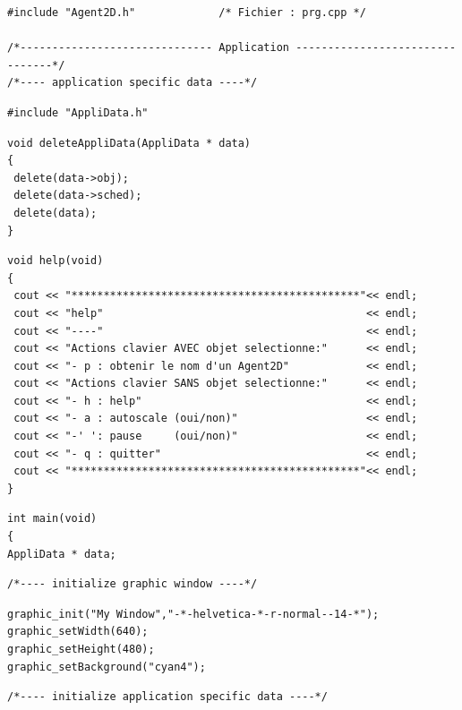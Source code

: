 \documentclass[12pt]{article}
\begin{document}
\begin{small}
\begin{verbatim}
#include "Agent2D.h"             /* Fichier : prg.cpp */

/*------------------------------ Application --------------------------------*/
/*---- application specific data ----*/
\end{verbatim}
\vspace{-0.4cm}
\begin{verbatim}
#include "AppliData.h"
\end{verbatim}
\vspace{-0.4cm}
\begin{verbatim}
void deleteAppliData(AppliData * data)
{
 delete(data->obj);
 delete(data->sched);
 delete(data);
}
\end{verbatim}
\vspace{-0.4cm}
\begin{verbatim}
void help(void)
{
 cout << "*********************************************"<< endl;
 cout << "help"                                         << endl;
 cout << "----"                                         << endl;
 cout << "Actions clavier AVEC objet selectionne:"      << endl;
 cout << "- p : obtenir le nom d'un Agent2D"            << endl;
 cout << "Actions clavier SANS objet selectionne:"      << endl;
 cout << "- h : help"                                   << endl;
 cout << "- a : autoscale (oui/non)"                    << endl;
 cout << "-' ': pause     (oui/non)"                    << endl;
 cout << "- q : quitter"                                << endl;
 cout << "*********************************************"<< endl;
}
\end{verbatim}
\vspace{-0.4cm}
\begin{verbatim}
int main(void)
{
AppliData * data;
\end{verbatim}
\vspace{-0.4cm}
\begin{verbatim}
/*---- initialize graphic window ----*/
\end{verbatim}
\vspace{-0.4cm}
\begin{verbatim}
graphic_init("My Window","-*-helvetica-*-r-normal--14-*");
graphic_setWidth(640);
graphic_setHeight(480);
graphic_setBackground("cyan4");
\end{verbatim}
\vspace{-0.4cm}
\begin{verbatim}
/*---- initialize application specific data ----*/

\end{verbatim}
\end{small}
\end{document}
